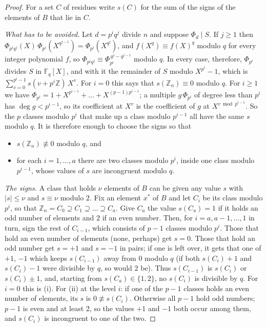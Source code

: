 \documentclass[11pt,a4paper]{amsart}
\theoremstyle{definition}
\theoremstyle{remark}
\newcommand{\Z}{\mathbb{Z}}
\begin{document}
\begin{proof}
For a set $C$ of residues write $s(C)$ for the sum of the signs of the elements of $B$ that lie in $C$.

\emph{What has to be avoided.} Let $d=p^iq^j$ divide $n$ and suppose $\Phi_d\mid S$. If $j\ge1$ then
$\Phi_{p^iq^j}(X)\,\Phi_{p^i}(X^{q^{j-1}})=\Phi_{p^i}(X^{q^j})$, and $f(X^q)\equiv f(X)^q$ modulo $q$ for every integer
polynomial $f$, so $\Phi_{p^iq^j}\equiv\Phi_{p^i}^{\,q^j-q^{j-1}}$ modulo $q$. In every case, therefore, $\Phi_{p^i}$
divides $S$ in $\mathbb{F}_q[X]$, and with it the remainder of $S$ modulo $X^{p^i}-1$, which is
$\sum_{v=0}^{p^i-1}s(v+p^i\Z)\,X^v$. For $i=0$ this says that $s(\Z_n)\equiv0$ modulo $q$. For $i\ge1$ we have
$\Phi_{p^i}=1+X^{p^{i-1}}+\dots+X^{(p-1)p^{i-1}}$; a multiple $g\,\Phi_{p^i}$ of degree less than $p^i$ has
$\deg g<p^{i-1}$, so its coefficient at $X^v$ is the coefficient of $g$ at $X^{v\bmod p^{i-1}}$. So the $p$ classes
modulo $p^i$ that make up a class modulo $p^{i-1}$ all have the same $s$ modulo $q$. It is therefore enough to
choose the signs so that
\begin{itemize}
\item[(i)] $s(\Z_n)\not\equiv0$ modulo $q$, and
\item[(ii)] for each $i=1,\dots,a$ there are two classes modulo $p^i$, inside one class modulo $p^{i-1}$, whose
values of $s$ are incongruent modulo $q$.
\end{itemize}

\emph{The signs.} A class that holds $\nu$ elements of $B$ can be given any value $s$ with $|s|\le\nu$ and
$s\equiv\nu$ modulo $2$. Fix an element $x^*$ of $B$ and let $C_i$ be its class modulo $p^i$, so that
$\Z_n=C_0\supseteq C_1\supseteq\dots\supseteq C_a$. Give $C_a$ the value $s(C_a)=1$ if it holds an odd number of
elements and $2$ if an even number. Then, for $i=a,a-1,\dots,1$ in turn, sign the rest of $C_{i-1}$, which
consists of $p-1$ classes modulo $p^i$. Those that hold an even number of elements (none, perhaps) get $s=0$. Those that hold an
odd number get $s=+1$ and $s=-1$ in pairs; if one is left over, it gets that one of $+1$, $-1$ which keeps
$s(C_{i-1})$ away from $0$ modulo $q$ (if both $s(C_i)+1$ and $s(C_i)-1$ were divisible by $q$, so would $2$ be).
Thus $s(C_{i-1})$ is $s(C_i)$ or $s(C_i)\pm1$, and, starting from $s(C_a)\in\{1,2\}$, no $s(C_i)$ is divisible by
$q$. For $i=0$ this is (i). For (ii) at the level $i$: if one of the $p-1$ classes holds an even number of
elements, its $s$ is $0\not\equiv s(C_i)$. Otherwise all $p-1$ hold odd numbers; $p-1$ is even and at least
$2$, so the values $+1$ and $-1$ both occur among them, and $s(C_i)$ is incongruent to one of the two.
\end{proof}
\end{document}

